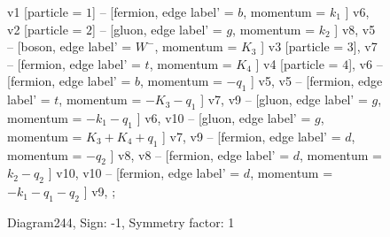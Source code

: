 \documentclass{revtex4}
\begin{document}
\begin{figure}[!htb]
\begin{center}
{    %
v1 [particle = \(1\)] -- [fermion, edge label' = \(b\), momentum = \(k_{1}\) ] v6, 
v2 [particle = \(2\)] -- [gluon, edge label' = \(g\), momentum = \(k_{2}\) ] v8, 
v5 -- [boson, edge label' = \(W^{-}\), momentum = \(K_{3}\) ] v3 [particle = \(3\)], 
v7 -- [fermion, edge label' = \(t\), momentum = \(K_{4}\) ] v4 [particle = \(4\)], 
v6 -- [fermion, edge label' = \(b\), momentum = \(-q_{1}\) ] v5, 
v5 -- [fermion, edge label' = \(t\), momentum = \(-K_{3} - q_{1}\) ] v7, 
v9 -- [gluon, edge label' = \(g\), momentum = \(-k_{1} - q_{1}\) ] v6, 
v10 -- [gluon, edge label' = \(g\), momentum = \(K_{3} + K_{4} + q_{1}\) ] v7, 
v9 -- [fermion, edge label' = \(d\), momentum = \(-q_{2}\) ] v8, 
v8 -- [fermion, edge label' = \(d\), momentum = \(k_{2} - q_{2}\) ] v10, 
v10 -- [fermion, edge label' = \(d\), momentum = \(-k_{1} - q_{1} - q_{2}\) ] v9, 
};
\end{center}
\caption{Diagram244, Sign: -1, Symmetry factor: 1}
\end{figure}
\newpage
\end{document}
